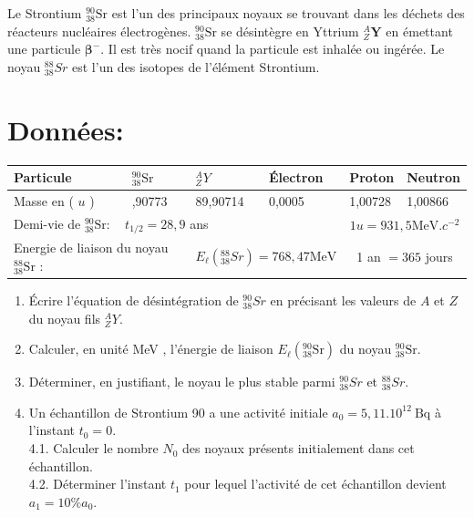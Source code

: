 Le Strontium ${ }_{38}^{90} \mathrm{Sr}$ est l'un des principaux noyaux se trouvant dans les déchets des réacteurs nucléaires électrogènes. ${ }_{38}^{90} \mathrm{Sr}$ se désintègre en Yttrium ${ }_{Z}^{A} \boldsymbol{Y}$ en émettant une particule $\boldsymbol{\beta}^{-}$. Il est très nocif quand la particule est inhalée ou ingérée. Le noyau ${ }_{38}^{88} S r$ est l'un des isotopes de l'élément Strontium.

\section*{Données:}
\begin{center}
\begin{tabular}{|l|l|l|l|l|l|}
\hline
Particule & ${ }_{38}^{90} \mathrm{Sr}$ & ${ }_{Z}^{A} Y$ & Électron & Proton & Neutron \\
\hline
Masse en ( $u$ ) & ,90773 & 89,90714 & 0,0005 & 1,00728 & 1,00866 \\
\hline
\multicolumn{4}{|l|}{Demi-vie de ${ }_{38}^{90} \mathrm{Sr}: \quad t_{1 / 2}=28,9$ ans} & \multicolumn{2}{|c|}{$1 u=931,5 \mathrm{MeV} . c^{-2}$} \\
\hline
\multicolumn{2}{|l|}{Energie de liaison du noyau ${ }_{38}^{88} \mathrm{Sr}$ :} & \multicolumn{2}{|r|}{$E_{\ell}\left({ }_{38}^{88} S r\right)=768,47 \mathrm{MeV}$} & \multicolumn{2}{|c|}{1 an $=365$ jours} \\
\hline
\end{tabular}
\end{center}

\begin{enumerate}
  \item Écrire l'équation de désintégration de ${ }_{38}^{90} S r$ en précisant les valeurs de $A$ et $Z$ du noyau fils ${ }_{Z}^{A} Y$.
  \item Calculer, en unité MeV , l'énergie de liaison $E_{\ell}\left({ }_{38}^{90} \mathrm{Sr}\right)$ du noyau ${ }_{38}^{90} \mathrm{Sr}$.
  \item Déterminer, en justifiant, le noyau le plus stable parmi ${ }_{38}^{90} S r$ et ${ }_{38}^{88} S r$.
  \item Un échantillon de Strontium 90 a une activité initiale $a_{0}=5,11.10^{12} \mathrm{~Bq}$ à l'instant $t_{0}=0$.\\
4.1. Calculer le nombre $N_{0}$ des noyaux présents initialement dans cet échantillon.\\
4.2. Déterminer l'instant $t_{1}$ pour lequel l'activité de cet échantillon devient $a_{1}=10 \% a_{0}$.
\end{enumerate}


